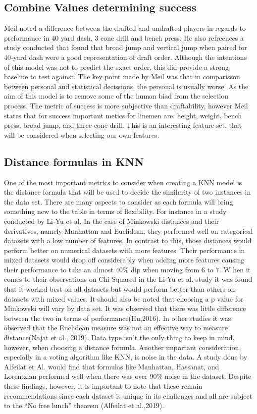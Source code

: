 \documentclass[confrence]{IEEEtran}
\begin{document}
\subsection*{Combine Values determining success}
Meil noted a difference between the drafted and undrafted players in regards to preformance in 40 yard dash, 3 cone drill and bench press.
He also refreences a study conducted that found that broad jump and vertical jump when paired for 40-yard dash were a good representation of draft order. 
Although the intentions of this model was not to predict the exact order, this did provide a strong baseline to test against.
The key point made by Meil was that in comparisson between personal and statistical decissions, the personal is usually worse.
As the aim of this model is to remove some of the human biad from the selection process.
The metric of success is more subjective than draftability, however Meil states that for success important metics for linemen are: height, weight, bench press, broad jump, and three-cone drill.
This is an interesting feature set, that will be considered when selecting our own features. 
\subsection*{Distance formulas in KNN}
One of the most important metrics to consider when creating a KNN model is the distance formula that will be used to decide the similarity of two instances in the data set. 
There are many aspects to consider as each formula will bring something new to the table in terms of flexibility. 
For instance in a study conducted by Li-Yu et al. 
In the case of Minkowski distances and their derivatives, namely Manhattan and Euclidean, they performed well on categorical datasets with a low number of features.  
In contrast to this, those distances would perform better on numerical datasets with more features. 
Their performance in mixed datasets would drop off considerably when adding more features causing their performance to take an almost 40\% dip when moving from 6 to 7. W
hen it comes to their observations on Chi Squared in the Li-Yu et al. study it was found that it worked best on all datasets but would perform better than others on datasets with mixed values. 
It should also be noted that choosing a p value for Minkowski will vary by data set. It was observed that there was little difference between the two in terms of performance(Hu,2016). 
In other studies it was observed that the Euclidean measure was not an effective way to measure distance(Najat et al., 2019). 
Data type isn't the only thing to keep in mind, however, when choosing a distance formula. Another important consideration, especially in a voting algorithm like KNN, is noise in the data. 
A study done by Alfeilat  et Al. would find that formulas like Manhattan, Hassanat, and Lorentzian performed well when there was over 90\% noise in the dataset. 
Despite these findings, however, it is important to note that these remain recommendations since each dataset is unique in its challenges and all are subject to the “No free lunch” theorem (Alfeilat et al.,2019).
\end{document}
